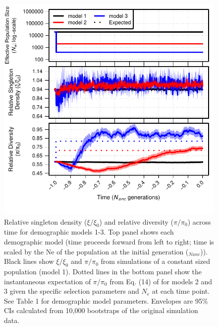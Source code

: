 \documentclass[9pt,twocolumn,twoside]{rilabRxiv}
\begin{document}
\begin{figure}[h!]
\includegraphics[width=.9\linewidth]{figures/Fig1.pdf}
\caption{Relative singleton density ($\xi/\xi_0$) and relative diversity ($\pi/\pi_0$) across time for demographic models 1-3.
Top panel shows each demographic model (time proceeds forward from left to right; time is scaled by the Ne of the population at the initial generation ($_{Nanc}$)).
Black lines show $\xi/\xi_0$ and $\pi/\pi_0$ from simulations of a constant sized population (model 1).
Dotted lines in the bottom panel show the instantaneous expectation of $\pi/\pi_0$ from Eq. (14) of \citet{nordborg} for models 2 and 3 given the specific selection parameters and $N_e$ at each time point.
See Table 1 for demographic model parameters.
Envelopes are 95\% CIs calculated from 10,000 bootstraps of the original simulation data.}
\label{fig:S6}
\end{figure}
\end{document}
